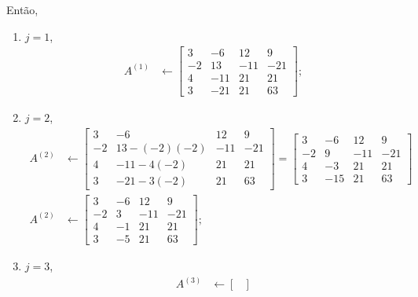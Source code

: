 \documentclass[a4paper,12pt, leqno, answers]{exam}
\begin{document}
\begin{questions}
\begin{solution}
        Ent\~{a}o,
        \begin{enumerate}
            \item $j = 1$,
                \begin{align*}
                    A^{(1)} &\leftarrow \begin{bmatrix}
                        3 & -6 & 12 & 9 \\
                        -2 & 13 & -11 & -21 \\
                        4 & -11 & 21 & 21 \\
                        3 & -21 & 21 & 63
                    \end{bmatrix};
                \end{align*}
            \item $j = 2$,
                \begin{align*}
                    A^{(2)} &\leftarrow \begin{bmatrix}
                        3 & -6 & 12 & 9 \\
                        -2 & 13 - (-2)(-2) & -11 & -21 \\
                        4 & -11 - 4(-2) & 21 & 21 \\
                        3 & -21 - 3(-2) & 21 & 63
                    \end{bmatrix} = \begin{bmatrix}
                        3 & -6 & 12 & 9 \\
                        -2 & 9 & -11 & -21 \\
                        4 & -3 & 21 & 21 \\
                        3 & -15 & 21 & 63
                    \end{bmatrix} \\
                    A^{(2)} &\leftarrow \begin{bmatrix}
                        3 & -6 & 12 & 9 \\
                        -2 & 3 & -11 & -21 \\
                        4 & -1 & 21 & 21 \\
                        3 & -5 & 21 & 63
                    \end{bmatrix};
                \end{align*}
           \item  $j = 3$,
               \begin{align*}
                   A^{(3)} &\leftarrow \begin{bmatrix}

\end{bmatrix}
\end{align*}
\end{enumerate}
\end{solution}
\end{questions}
\end{document}
